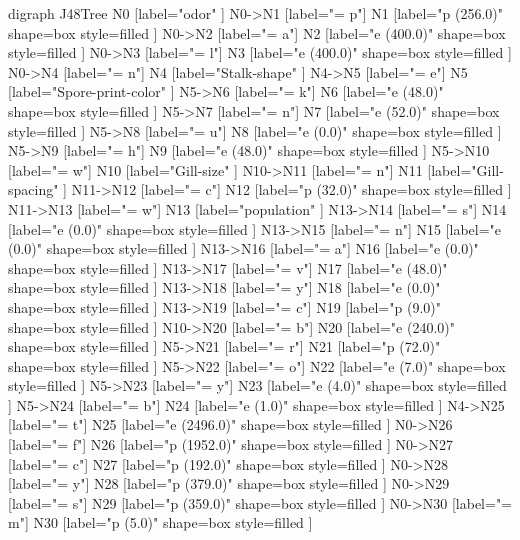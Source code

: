 digraph J48Tree {
N0 [label="odor" ]
N0->N1 [label="= p"]
N1 [label="p (256.0)" shape=box style=filled ]
N0->N2 [label="= a"]
N2 [label="e (400.0)" shape=box style=filled ]
N0->N3 [label="= l"]
N3 [label="e (400.0)" shape=box style=filled ]
N0->N4 [label="= n"]
N4 [label="Stalk-shape" ]
N4->N5 [label="= e"]
N5 [label="Spore-print-color" ]
N5->N6 [label="= k"]
N6 [label="e (48.0)" shape=box style=filled ]
N5->N7 [label="= n"]
N7 [label="e (52.0)" shape=box style=filled ]
N5->N8 [label="= u"]
N8 [label="e (0.0)" shape=box style=filled ]
N5->N9 [label="= h"]
N9 [label="e (48.0)" shape=box style=filled ]
N5->N10 [label="= w"]
N10 [label="Gill-size" ]
N10->N11 [label="= n"]
N11 [label="Gill-spacing" ]
N11->N12 [label="= c"]
N12 [label="p (32.0)" shape=box style=filled ]
N11->N13 [label="= w"]
N13 [label="population" ]
N13->N14 [label="= s"]
N14 [label="e (0.0)" shape=box style=filled ]
N13->N15 [label="= n"]
N15 [label="e (0.0)" shape=box style=filled ]
N13->N16 [label="= a"]
N16 [label="e (0.0)" shape=box style=filled ]
N13->N17 [label="= v"]
N17 [label="e (48.0)" shape=box style=filled ]
N13->N18 [label="= y"]
N18 [label="e (0.0)" shape=box style=filled ]
N13->N19 [label="= c"]
N19 [label="p (9.0)" shape=box style=filled ]
N10->N20 [label="= b"]
N20 [label="e (240.0)" shape=box style=filled ]
N5->N21 [label="= r"]
N21 [label="p (72.0)" shape=box style=filled ]
N5->N22 [label="= o"]
N22 [label="e (7.0)" shape=box style=filled ]
N5->N23 [label="= y"]
N23 [label="e (4.0)" shape=box style=filled ]
N5->N24 [label="= b"]
N24 [label="e (1.0)" shape=box style=filled ]
N4->N25 [label="= t"]
N25 [label="e (2496.0)" shape=box style=filled ]
N0->N26 [label="= f"]
N26 [label="p (1952.0)" shape=box style=filled ]
N0->N27 [label="= c"]
N27 [label="p (192.0)" shape=box style=filled ]
N0->N28 [label="= y"]
N28 [label="p (379.0)" shape=box style=filled ]
N0->N29 [label="= s"]
N29 [label="p (359.0)" shape=box style=filled ]
N0->N30 [label="= m"]
N30 [label="p (5.0)" shape=box style=filled ]
}

